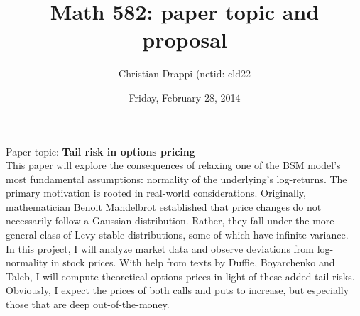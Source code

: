 \documentclass[]{article}
\begin{document}
\title{Math 582: paper topic and proposal}
\author{Christian Drappi (netid: cld22}
\date{Friday, February 28, 2014}
\maketitle

\Large

\noindent Paper topic: {\bf Tail risk in options pricing } \\

\noindent This paper will explore the consequences of relaxing one of the BSM model's most fundamental assumptions: normality of the underlying's log-returns. The primary motivation is rooted in real-world considerations. Originally, mathematician Benoit Mandelbrot established that price changes do not necessarily follow a Gaussian distribution. Rather, they fall under the more general class of Levy stable distributions, some of which have infinite variance. \\

\noindent In this project, I will analyze market data and observe deviations from log-normality in stock prices. With help from texts by Duffie, Boyarchenko and Taleb, I will compute theoretical options prices in light of these added tail risks. Obviously, I expect the prices of both calls and puts to increase, but especially those that are deep out-of-the-money.
\end{document}
